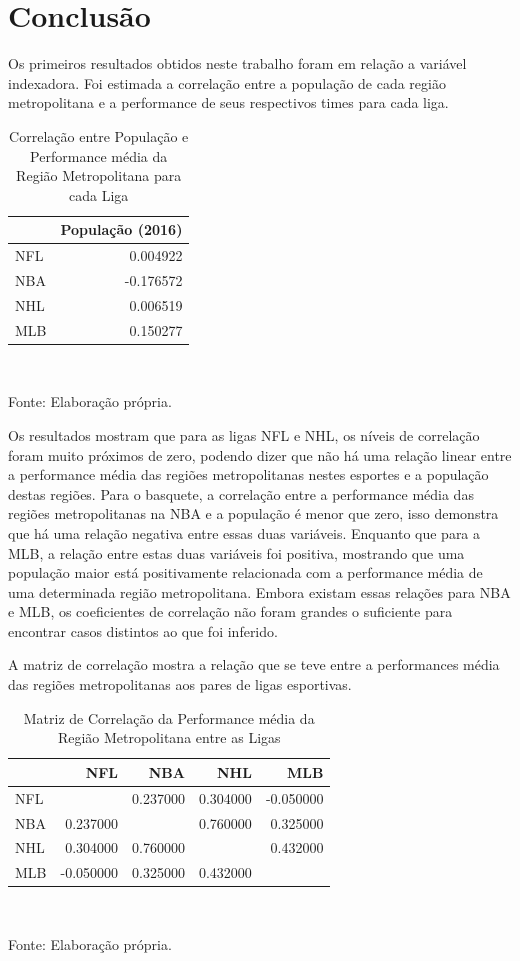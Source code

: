 \documentclass[12pt,oneside,a4paper,chapter=TITLE,english,brazil,sumario=abnt-6027-2012]{abntex2}
\begin{document}
	
\chapter{Conclusão}

	Os primeiros resultados obtidos neste trabalho foram em relação a variável indexadora. Foi estimada a correlação entre a população de cada região metropolitana e a performance de seus respectivos times para cada liga. 
	
	\begin{table}[H]
	\centering
	\caption{Correlação entre População e Performance média da Região Metropolitana para cada Liga}
	\begin{tabular}{lr}\hline
	& População (2016) \\\hline
	NFL & 0.004922 \\
	NBA & -0.176572 \\
	NHL & 0.006519 \\
	MLB & 0.150277 \\\hline
	\end{tabular}
	\label{tab:corr_table}
	\\ \vspace{0.25cm}
	\raggedright
	\footnotesize{Fonte: Elaboração própria.}
	\end{table}

	Os resultados mostram que para as ligas NFL e NHL, os níveis de correlação foram muito próximos de zero, podendo dizer que não há uma relação linear entre a performance média das regiões metropolitanas nestes esportes e a população destas regiões. Para o basquete, a correlação entre a performance média das regiões metropolitanas na NBA e a população é menor que zero, isso demonstra que há uma relação negativa entre essas duas variáveis. Enquanto que para a MLB, a relação entre estas duas variáveis foi positiva, mostrando que uma população maior está positivamente relacionada com a performance média de uma determinada região metropolitana. Embora existam essas relações para NBA e MLB, os coeficientes de correlação não foram grandes o suficiente para encontrar casos distintos ao que foi inferido.
	
	A matriz de correlação mostra a relação que se teve entre a performances média das regiões metropolitanas aos pares de ligas esportivas.

	\begin{table}[H]
	\centering
	\caption{Matriz de Correlação da Performance média da Região Metropolitana entre as Ligas}
	\begin{tabular}{lrrrr}
	& NFL & NBA & NHL & MLB \\\hline
	NFL &  & 0.237000 & 0.304000 & -0.050000 \\\hline
	NBA & 0.237000 &  & 0.760000 & 0.325000 \\\hline
	NHL & 0.304000 & 0.760000 &  & 0.432000 \\\hline
	MLB & -0.050000 & 0.325000 & 0.432000 &  \\\hline
	\end{tabular}
	\label{tab:corr_matrix}
	\\ \vspace{0.25cm}
	\raggedright
	\footnotesize{Fonte: Elaboração própria.}
	\end{table}	

	
	
	
\end{document}
